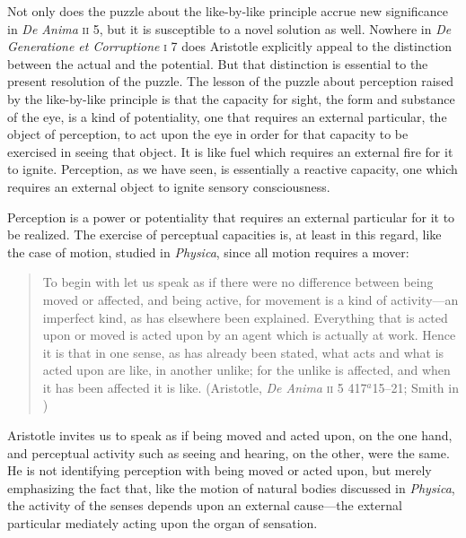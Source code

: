 Not only does the puzzle about the like-by-like principle accrue new significance in \emph{De Anima} \textsc{ii} 5, but it is susceptible to a novel solution as well. Nowhere in \emph{De Generatione et Corruptione} \textsc{i} 7 does Aristotle explicitly appeal to the distinction between the actual and the potential. But that distinction is essential to the present resolution of the puzzle. The lesson of the puzzle about perception raised by the like-by-like principle is that the capacity for sight, the form and substance of the eye, is a kind of potentiality, one that requires an external particular, the object of perception, to act upon the eye in order for that capacity to be exercised in seeing that object. It is like fuel which requires an external fire for it to ignite. Perception, as we have seen, is essentially a reactive capacity, one which requires an external object to ignite sensory consciousness.

Perception is a power or potentiality that requires an external particular for it to be realized. The exercise of perceptual capacities is, at least in this regard, like the case of motion, studied in \emph{Physica}, since all motion requires a mover:
\begin{quote}
	To begin with let us speak as if there were no difference between being moved or affected, and being active, for movement is a kind of activity---an imperfect kind, as has elsewhere been explained. Everything that is acted upon or moved is acted upon by an agent which is actually at work. Hence it is that in one sense, as has already been stated, what acts and what is acted upon are like, in another unlike; for the unlike is affected, and when it has been affected it is like. (Aristotle, \emph{De Anima} \textsc{ii} 5 417\( ^{a} \)15--21; Smith in \citealt[30]{Barnes:1984uq})
\end{quote}
Aristotle invites us to speak as if being moved and acted upon, on the one hand, and perceptual activity such as seeing and hearing, on the other, were the same. He is not identifying perception with being moved or acted upon, but merely emphasizing the fact that, like the motion of natural bodies discussed in \emph{Physica}, the activity of the senses depends upon an external cause---the external particular mediately acting upon the organ of sensation.

